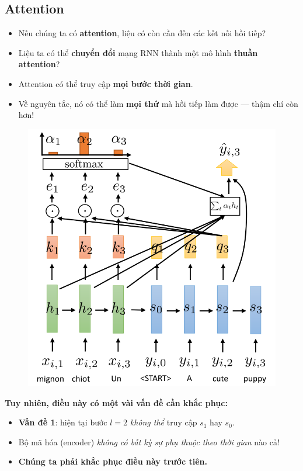 \documentclass{book}
\begin{document}
    \subsection{Attention}
    \begin{itemize}
        \item Nếu chúng ta có \textbf{attention}, liệu có còn cần đến các kết nối hồi tiếp?
        \item Liệu ta có thể \textbf{chuyển đổi} mạng RNN thành một mô hình \textbf{thuần attention}?
        \item Attention có thể truy cập \textbf{mọi bước thời gian}.
        \item Về nguyên tắc, nó có thể làm \textbf{mọi thứ} mà hồi tiếp làm được — thậm chí còn hơn!
    \end{itemize}
    \begin{figure}[H]
        \centering
        \includegraphics[width=0.8\linewidth]{images/rnn_att.png}
        \label{fig:rnn_att}
    \end{figure}
    \textbf{Tuy nhiên, điều này có một vài vấn đề cần khắc phục:}
    \begin{itemize}
        \item \textbf{Vấn đề 1}: hiện tại bước $l = 2$ \textit{không thể} truy cập $s_1$ hay $s_0$.
        \item Bộ mã hóa (encoder) \textit{không có bất kỳ sự phụ thuộc theo thời gian} nào cả!
        \item \textbf{Chúng ta phải khắc phục điều này trước tiên.}
    \end{itemize}
\end{document}
